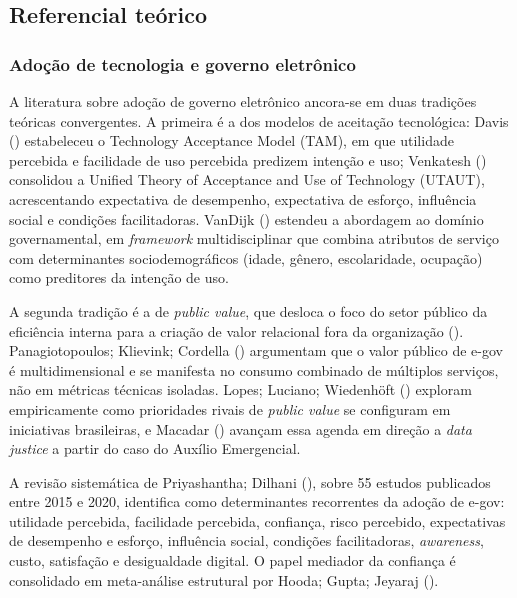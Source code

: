\documentclass[
  man,
  floatsintext,
  longtable,
  a4paper,
  nolmodern,
  notxfonts,
  notimes,
  colorlinks=true,linkcolor=blue,citecolor=blue,urlcolor=blue]{apa7}
\begin{document}
\subsection{Referencial teórico}\label{referencial-teuxf3rico}

\subsubsection{Adoção de tecnologia e governo
eletrônico}\label{adouxe7uxe3o-de-tecnologia-e-governo-eletruxf4nico}

A literatura sobre adoção de governo eletrônico ancora-se em duas
tradições teóricas convergentes. A primeira é a dos modelos de aceitação
tecnológica: Davis () estabeleceu
o Technology Acceptance Model (TAM), em que utilidade percebida e
facilidade de uso percebida predizem intenção e uso; Venkatesh
() consolidou a Unified Theory
of Acceptance and Use of Technology (UTAUT), acrescentando expectativa
de desempenho, expectativa de esforço, influência social e condições
facilitadoras. VanDijk ()
estendeu a abordagem ao domínio governamental, em \emph{framework}
multidisciplinar que combina atributos de serviço com determinantes
sociodemográficos (idade, gênero, escolaridade, ocupação) como
preditores da intenção de uso.

A segunda tradição é a de \emph{public value}, que desloca o foco do
setor público da eficiência interna para a criação de valor relacional
fora da organização
(). Panagiotopoulos; Klievink; Cordella
() argumentam que o valor
público de e-gov é multidimensional e se manifesta no consumo combinado
de múltiplos serviços, não em métricas técnicas isoladas. Lopes;
Luciano; Wiedenhöft () exploram
empiricamente como prioridades rivais de \emph{public value} se
configuram em iniciativas brasileiras, e Macadar
() avançam essa agenda em
direção a \emph{data justice} a partir do caso do Auxílio Emergencial.

A revisão sistemática de Priyashantha; Dilhani
(), sobre 55 estudos
publicados entre 2015 e 2020, identifica como determinantes recorrentes
da adoção de e-gov: utilidade percebida, facilidade percebida,
confiança, risco percebido, expectativas de desempenho e esforço,
influência social, condições facilitadoras, \emph{awareness}, custo,
satisfação e desigualdade digital. O papel mediador da confiança é
consolidado em meta-análise estrutural por Hooda; Gupta; Jeyaraj
().
\end{document}
